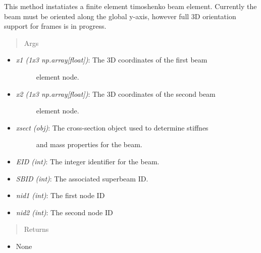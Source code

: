\documentclass[letterpaper,10pt,english]{sphinxmanual}
\begin{document}
\begin{fulllineitems}
\begin{fulllineitems}
This method instatiates a finite element timoshenko beam element.
Currently the beam must be oriented along the global y-axis, however
full 3D orientation support for frames is in progress.
\begin{quote}\begin{description}
\item[{Args}] \leavevmode
\end{description}\end{quote}
\begin{itemize}
\item {} \begin{description}
\item[{\emph{x1 (1x3 np.array{[}float{]})}: The 3D coordinates of the first beam}] \leavevmode
element node.

\end{description}

\item {} \begin{description}
\item[{\emph{x2 (1x3 np.array{[}float{]})}: The 3D coordinates of the second beam}] \leavevmode
element node.

\end{description}

\item {} \begin{description}
\item[{\emph{xsect (obj)}: The cross-section object used to determine stiffnes}] \leavevmode
and mass properties for the beam.

\end{description}

\item {} 
\emph{EID (int)}: The integer identifier for the beam.

\item {} 
\emph{SBID (int)}: The associated superbeam ID.

\item {} 
\emph{nid1 (int)}: The first node ID

\item {} 
\emph{nid2 (int)}: The second node ID

\end{itemize}
\begin{quote}\begin{description}
\item[{Returns}] \leavevmode
\end{description}\end{quote}
\begin{itemize}
\item {} 
None


\end{itemize}
\end{fulllineitems}
\end{fulllineitems}
\end{document}
